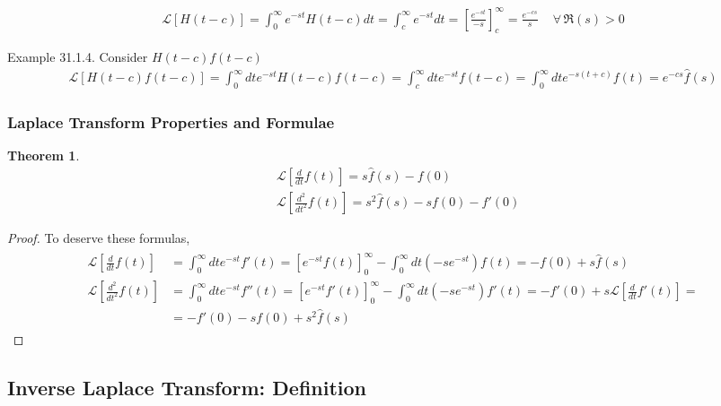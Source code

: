 \documentclass[10pt]{amsart}
\newtheorem{theorem}{Theorem}
\begin{document}
\begin{multicols*}{2}
\[
\begin{gathered}
\mathcal{L}[H(t-c)] = \int_0^{\infty} e^{-st} H(t-c) dt = \int_c^{\infty} e^{-st} dt = \left[ \frac{e^{-st}}{-s} \right]_c^{\infty} = \frac{e^{-cs}}{s} \quad \, \forall \, \Re{(s)} > 0
\end{gathered}
\]

Example 31.1.4. Consider $H(t-c) f(t-c)$
\[
\begin{gathered}
\mathcal{L}[H(t-c) f(t-c)] = \int_0^{\infty} dt e^{-st} H(t-c) f(t-c) = \int_c^{\infty} dt e^{-st} f(t-c) = \int_0^{\infty} dt e^{-s(t+c) } f(t) = e^{-cs} \widehat{f}(s)
\end{gathered}
\]

\subsubsection{Laplace Transform Properties and Formulae}

\begin{theorem}
\begin{equation}
\begin{aligned}
& \mathcal{L}\left[ \frac{d}{dt} f(t) \right] = s\widehat{f}(s) - f(0) \\
& \mathcal{L}\left[ \frac{d^2}{dt^2} f(t) \right] = s^2 \widehat{f}(s) - sf(0) - f'(0)
\end{aligned}
\end{equation}
\end{theorem}

\begin{proof}
To deserve these formulas,
\[
\begin{gathered}
\begin{aligned}
\mathcal{L}\left[ \frac{d}{dt} f(t) \right] & = \int_0^{\infty} dt e^{-st} f'(t) = \left[ e^{-st}f(t) \right]_0^{\infty} - \int_0^{\infty}dt (-se^{-st}) f(t) = -f(0) + s\widehat{f}(s) \\
\mathcal{L}\left[ \frac{d^2}{dt^2} f(t) \right] & = \int_0^{\infty} dt e^{-st} f''(t) = \left[ e^{-st} f'(t) \right]_0^{\infty} - \int_0^{\infty} dt (-se^{-st} ) f'(t) = -f'(0) + s \mathcal{L} [ \frac{d}{dt} f'(t) ] = \\
& = -f'(0) - sf(0 ) + s^2 \widehat{f}(s)
\end{aligned}
\end{gathered}
\]
\end{proof}

\subsection{Inverse Laplace Transform: Definition}


\end{multicols*}
\end{document}
